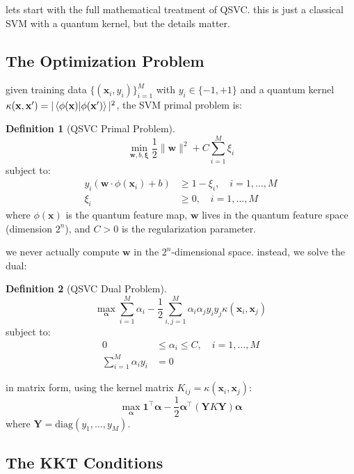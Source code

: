 \documentclass[11pt,a4paper]{article}
\theoremstyle{definition}
\newtheorem{definition}{Definition}[section]
\theoremstyle{remark}
\begin{document}
lets start with the full mathematical treatment of QSVC. this is just a classical SVM with a quantum kernel, but the details matter.

\subsection{The Optimization Problem}

given training data $\{(\mathbf{x}_i, y_i)\}_{i=1}^M$ with $y_i \in \{-1, +1\}$ and a quantum kernel $\kappa(\mathbf{x}, \mathbf{x}') = |\braket{\phi(\mathbf{x})|\phi(\mathbf{x}')}|^2$, the SVM primal problem is:

\begin{definition}[QSVC Primal Problem]
\[
\min_{\mathbf{w}, b, \boldsymbol{\xi}} \frac{1}{2}\|\mathbf{w}\|^2 + C \sum_{i=1}^M \xi_i
\]
subject to:
\begin{align}
y_i(\mathbf{w} \cdot \phi(\mathbf{x}_i) + b) &\geq 1 - \xi_i, \quad i = 1, \ldots, M \\
\xi_i &\geq 0, \quad i = 1, \ldots, M
\end{align}
where $\phi(\mathbf{x})$ is the quantum feature map, $\mathbf{w}$ lives in the quantum feature space (dimension $2^n$), and $C > 0$ is the regularization parameter.
\end{definition}

we never actually compute $\mathbf{w}$ in the $2^n$-dimensional space. instead, we solve the dual:

\begin{definition}[QSVC Dual Problem]
\[
\max_{\boldsymbol{\alpha}} \sum_{i=1}^M \alpha_i - \frac{1}{2} \sum_{i,j=1}^M \alpha_i \alpha_j y_i y_j \kappa(\mathbf{x}_i, \mathbf{x}_j)
\]
subject to:
\begin{align}
0 &\leq \alpha_i \leq C, \quad i = 1, \ldots, M \\
\sum_{i=1}^M \alpha_i y_i &= 0
\end{align}
\end{definition}

in matrix form, using the kernel matrix $K_{ij} = \kappa(\mathbf{x}_i, \mathbf{x}_j)$:
\[
\max_{\boldsymbol{\alpha}} \mathbf{1}^\top \boldsymbol{\alpha} - \frac{1}{2} \boldsymbol{\alpha}^\top (\mathbf{Y} K \mathbf{Y}) \boldsymbol{\alpha}
\]
where $\mathbf{Y} = \text{diag}(y_1, \ldots, y_M)$.

\subsection{The KKT Conditions}
\end{document}

